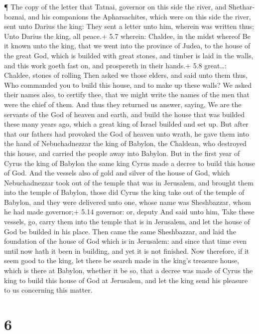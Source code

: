  ¶ The copy of the letter that Tatnai, governor on this side
the river, and Shethar-boznai, and his companions the Apharsachites,
which were on this side the river, sent unto Darius the king:
 They sent a letter unto him, wherein was written thus; Unto
Darius the king, all peace.+ 5.7 wherein: Chaldee, in the midst whereof
 Be it known unto the king, that we went into the province
of Judea, to the house of the great God, which is builded with great
stones, and timber is laid in the walls, and this work goeth fast on,
and prospereth in their hands.+ 5.8 great\ldots: Chaldee, stones of
rolling  Then asked we those elders, and said unto them
thus, Who commanded you to build this house, and to make up these walls?
 We asked their names also, to certify thee, that we might
write the names of the men that were the chief of them. 
And thus they returned us answer, saying, We are the servants of the God
of heaven and earth, and build the house that was builded these many
years ago, which a great king of Israel builded and set up.
 But after that our fathers had provoked the God of heaven
unto wrath, he gave them into the hand of Nebuchadnezzar the king of
Babylon, the Chaldean, who destroyed this house, and carried the people
away into Babylon.  But in the first year of Cyrus the king
of Babylon the same king Cyrus made a decree to build this house of God.
 And the vessels also of gold and silver of the house of
God, which Nebuchadnezzar took out of the temple that was in Jerusalem,
and brought them into the temple of Babylon, those did Cyrus the king
take out of the temple of Babylon, and they were delivered unto one,
whose name was Sheshbazzar, whom he had made governor;+ 5.14 governor:
or, deputy  And said unto him, Take these vessels, go,
carry them into the temple that is in Jerusalem, and let the house of
God be builded in his place.  Then came the same
Sheshbazzar, and laid the foundation of the house of God which is in
Jerusalem: and since that time even until now hath it been in building,
and yet it is not finished.  Now therefore, if it seem good
to the king, let there be search made in the king's treasure house,
which is there at Babylon, whether it be so, that a decree was made of
Cyrus the king to build this house of God at Jerusalem, and let the king
send his pleasure to us concerning this matter.

\hypertarget{section-5}{%
\section{6}\label{section-5}}

